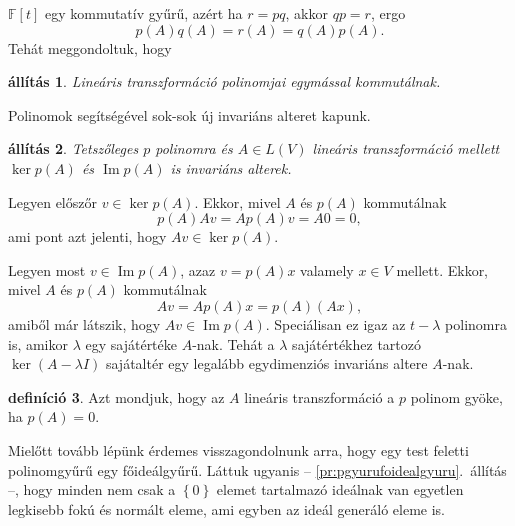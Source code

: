 \documentclass[9pt, a4paper, showtrims]{memoir}
\makeatletter
\renewenvironment{proof}[1][\proofname]
    {\par\pushQED{\qed}%
    \normalfont \topsep6\p@\@plus6\p@\relax
    \trivlist
    \item[\hskip\labelsep
        \itshape
    #1\@addpunct{:}]\ignorespaces}
    {\popQED\endtrivlist\@endpefalse}
\theoremstyle{plain}
\newtheorem{proposition}{állítás}[chapter]
\theoremstyle{remark}
\theoremstyle{definition}
\newtheorem{definition}[proposition]{definíció}
\DeclareMathOperator{\im}{Im}
\makeatother
\begin{document}
$\mathbb{F}\left[ t \right]$ egy kommutatív gyűrű,
azért ha $r=pq$, akkor $qp=r$,
ergo
\[
	p\left( A \right)q\left( A \right)=r\left( A \right)=q\left( A \right)p\left( A \right).
\]
Tehát meggondoltuk, hogy
\begin{proposition}
	Lineáris transzformáció polinomjai egymással kommutálnak.
\end{proposition}
Polinomok segítségével sok-sok új invariáns alteret kapunk.
\begin{proposition}
	Tetszőleges $p$ polinomra és $A\in L\left( V \right)$
	lineáris transzformáció mellett
	$\ker p\left( A \right)$ és $\im p\left( A \right)$ is invariáns alterek.
\end{proposition}
\begin{proof}
	Legyen előszőr $v\in\ker p\left( A \right)$.
	Ekkor, mivel $A$ és $p\left( A \right)$ kommutálnak
	\[
		p\left( A \right)Av=Ap\left( A \right)v=A0=0,
	\]
	ami pont azt jelenti, hogy $Av\in\ker p\left( A \right)$.

	Legyen most $v\in\im p\left( A \right)$,
	azaz
	$v=p\left( A \right)x$ valamely $x\in V$ mellett.
	Ekkor, mivel $A$ és $p\left( A \right)$ kommutálnak
	\[
		Av=Ap\left( A \right)x=p\left( A \right)\left( Ax \right),
	\]
	amiből már látszik, hogy $Av\in\im p\left( A \right)$.
\end{proof}
Speciálisan ez igaz az $t-\lambda$ polinomra is,
amikor $\lambda$
egy sajátértéke $A$-nak. Tehát a $\lambda$ sajátértékhez tartozó
$\ker \left( A-\lambda I \right)$ sajátaltér egy legalább egydimenziós invariáns altere
$A$-nak.
\begin{definition}
	Azt mondjuk, hogy az $A$ lineáris transzformáció a $p$ polinom gyöke,
	ha $p\left( A \right)=0$.
\end{definition}
Mielőtt tovább lépünk érdemes visszagondolnunk arra,
hogy egy test feletti polinomgyűrű egy főideálgyűrű.
Láttuk ugyanis
-- \ref{pr:pgyurufoidealgyuru}.~állítás --,
hogy minden nem csak a $\left\{ 0 \right\}$ elemet tartalmazó ideálnak
van egyetlen legkisebb fokú és normált eleme,
ami egyben az ideál generáló eleme is.
\end{document}
